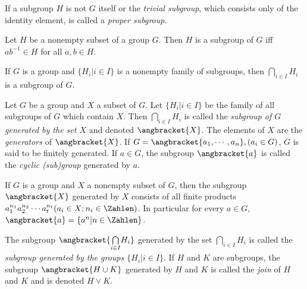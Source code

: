 \begin{definition}
	If a subgroup $ H $ is not $ G $ itself or the \textit{trivial subgroup}, which consists only of the identity element, is called a \textit{proper subgroup}.
\end{definition}
\begin{theorem}
	Let $ H $ be a nonempty subset of a group $ G $. Then $ H $ is a subgroup of $ G $ iff $ a b^{-1}\in H $ for all $ a,b \in H $.
\end{theorem}
\begin{Corollary}
	If $ G $ is a group and $ \{H_i|i \in I \} $ is a nonempty family of subgroups, then $ \underset{i \in I}{\bigcap}H_i $ is a subgroup of $ G $.
\end{Corollary}


\begin{definition}
	Let $ G $ be a group and $ X $ a subset of $ G $. Let $ \{H_i|i \in I \} $ be the family of all subgroups of $ G $ which contain $ X $. Then $ \underset{i \in I}{\bigcap}H_i $ is called the \textit{subgroup of $ G $ generated by the set $ X $} and denoted $ \angbracket{X}$. The elements of $ X $ are the \textit{generators} of $ \angbracket{X} $. If $ G=\angbracket{a_1,\cdots,a_n} ,(a_i \in G)$, $ G $ is said to be finitely generated. If $ a \in G $, the subgroup $ \angbracket{a} $ is called the \textit{cyclic (sub)group} generated by $ a $.
\end{definition}

\begin{theorem}
	If $ G $ is a group and $ X $ a nonempty subset of $ G $, then the subgroup $ \angbracket{X} $ generated by $ X $ consists of all finite products $ a_1^{n_1} a_2^{n_2}\cdots a_t^{n_t}(a_i \in X;n_i \in \Zahlen)$. In particular for every $ a \in G $, $ \angbracket{a}=\{a^n|n\in \Zahlen \} $.
\end{theorem}

\begin{definition}
	The subgroup $ \angbracket{\underset{i \in I}{\bigcap}H_i } $ generated by the set $ \underset{i \in I}{\bigcap}H_i  $ is called the \textit{subgroup generated by the groups $ \{H_i | i \in I \} $}. If $ H $ and $ K $ are subgroups, the subgroup $ \angbracket{H \cup K} $ generated by $ H $ and $ K $ is called the \textit{join} of $ H $ and $ K $ and is denoted $ H \lor K $.
\end{definition}

